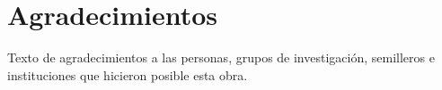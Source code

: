 
\chapter{Agradecimientos}

Texto de agradecimientos a las personas, grupos de investigación, semilleros e instituciones que hicieron posible esta obra. \lipsum[3]
